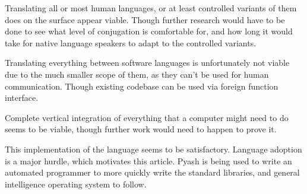 Translating all or most human languages, or at least controlled
variants of them does on the surface appear viable. Though further research
would have to be done to see what level of conjugation is comfortable for, and
how long it would take for native language speakers to adapt to the controlled
variants. 

Translating everything between software languages is unfortunately not
 viable due to the much smaller scope of them, as they can't be used for 
 human communication. Though existing codebase can be used via foreign function
 interface. 

Complete vertical integration of everything that a computer might need to do
seems to be viable, though further work would need to happen to prove it. 

This implementation of the language seems to be satisfactory. 
Language adoption is a major hurdle, which motivates this article.
Pyash is being used to write an automated programmer to more quickly write the
standard libraries, and general intelligence operating system to follow.
